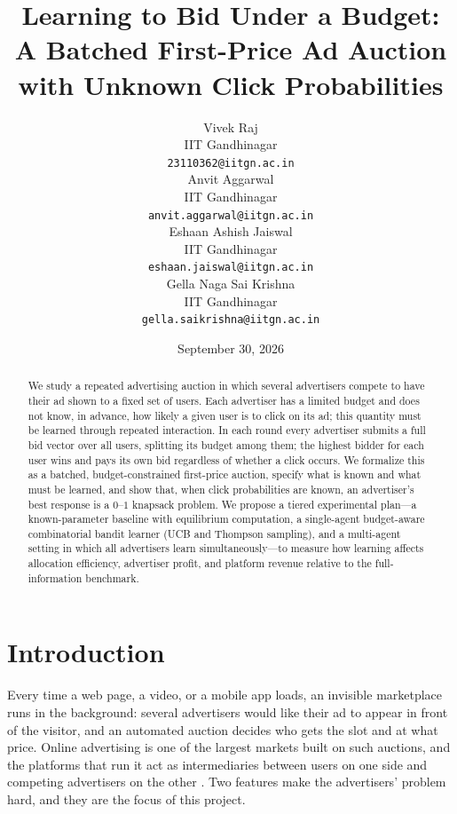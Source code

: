 \documentclass{article}
\title{Learning to Bid Under a Budget: A Batched First-Price Ad Auction with Unknown Click Probabilities}
\author{
  Vivek Raj \\
  IIT Gandhinagar\\
  \texttt{23110362@iitgn.ac.in} \\
  \And
  Anvit Aggarwal \\
  IIT Gandhinagar\\
  \texttt{anvit.aggarwal@iitgn.ac.in} \\
  \And
  Eshaan Ashish Jaiswal \\
  IIT Gandhinagar\\
  \texttt{eshaan.jaiswal@iitgn.ac.in} \\
  \And
  Gella Naga Sai Krishna \\
  IIT Gandhinagar\\
  \texttt{gella.saikrishna@iitgn.ac.in} \\
}
\date{September 30, 2026}
\theoremstyle{definition}
\theoremstyle{remark}
\begin{document}
\maketitle

\begin{abstract}
We study a repeated advertising auction in which several advertisers compete to have their ad shown to a fixed set of users. Each advertiser has a limited budget and does not know, in advance, how likely a given user is to click on its ad; this quantity must be learned through repeated interaction. In each round every advertiser submits a full bid vector over all users, splitting its budget among them; the highest bidder for each user wins and pays its own bid regardless of whether a click occurs. We formalize this as a batched, budget-constrained first-price auction, specify what is known and what must be learned, and show that, when click probabilities are known, an advertiser's best response is a $0$--$1$ knapsack problem. We propose a tiered experimental plan---a known-parameter baseline with equilibrium computation, a single-agent budget-aware combinatorial bandit learner (UCB and Thompson sampling), and a multi-agent setting in which all advertisers learn simultaneously---to measure how learning affects allocation efficiency, advertiser profit, and platform revenue relative to the full-information benchmark.
\end{abstract}


\section{Introduction}
\label{sec:intro}

Every time a web page, a video, or a mobile app loads, an invisible marketplace runs in the background: several advertisers would like their ad to appear in front of the visitor, and an automated auction decides who gets the slot and at what price. Online advertising is one of the largest markets built on such auctions, and the platforms that run it act as intermediaries between users on one side and competing advertisers on the other \citep{edelman2007internet,varian2007position}. Two features make the advertisers' problem hard, and they are the focus of this project.
\end{document}
